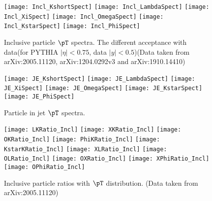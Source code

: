 \begin{figure}[ht]
        \begin{center}
                \texttt{[image: Incl\_KshortSpect]}
                \texttt{[image: Incl\_LambdaSpect]}
                \texttt{[image: Incl\_XiSpect]}
                \texttt{[image: Incl\_OmegaSpect]}
                \texttt{[image: Incl\_KstarSpect]}
                \texttt{[image: Incl\_PhiSpect]}
        \end{center}
	\caption{Inclusive particle $\pT$ spectra. The different acceptance with data(for PYTHIA $|\eta|<0.75$, data $|y|<0.5$)(Data taken from arXiv:2005.11120, arXiv:1204.0292v3 and arXiv:1910.14410)}
        \label{fig:InclParSpect}
\end{figure}


\begin{figure}[ht]
	\begin{center}
		\texttt{[image: JE\_KshortSpect]}
		\texttt{[image: JE\_LambdaSpect]}
		\texttt{[image: JE\_XiSpect]}
		\texttt{[image: JE\_OmegaSpect]}
		\texttt{[image: JE\_KstarSpect]}
		\texttt{[image: JE\_PhiSpect]}
	\end{center}
	\caption{Particle in jet $\pT$ spectra.}
	\label{fig:JEParSpect}
\end{figure}

\begin{figure}[ht]
        \begin{center}
                \texttt{[image: LKRatio\_Incl]}
                \texttt{[image: XKRatio\_Incl]}
                \texttt{[image: OKRatio\_Incl]}
                \texttt{[image: PhiKRatio\_Incl]}
                \texttt{[image: KstarKRatio\_Incl]}
                \texttt{[image: XLRatio\_Incl]}
                \texttt{[image: OLRatio\_Incl]}
                \texttt{[image: OXRatio\_Incl]}
                \texttt{[image: XPhiRatio\_Incl]}
                \texttt{[image: OPhiRatio\_Incl]}
        \end{center}
	\caption{Inclusive particle ratios with $\pT$ distribution. (Data taken from arXiv:2005.11120)}
        \label{fig:InclParRatio}
\end{figure}

